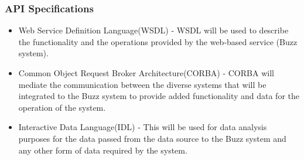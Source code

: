 \subsubsection{API Specifications}
\begin{itemize}
\item Web Service Definition Language(WSDL) - WSDL will be used to describe the functionality and the operations provided by the web-based service (Buzz system).
\item Common Object Request Broker Architecture(CORBA) - CORBA will mediate the communication between the diverse systems that will be integrated to the Buzz system to provide added functionality and data for the operation of the system.
\item Interactive Data Language(IDL) - This will be used for data analysis purposes for the data passed from the data source to the Buzz system and any other form of data required by the system.
\end{itemize}


